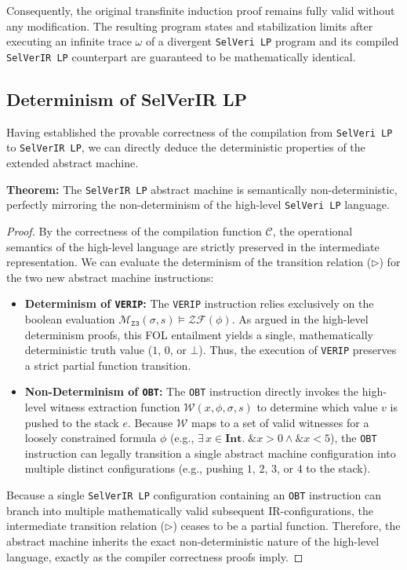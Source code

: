 \documentclass{article}
\begin{document}
Consequently, the original transfinite induction proof remains fully valid without any modification. The resulting program states and stabilization limits after executing an infinite trace $\omega$ of a divergent \texttt{SelVeri LP} program and its compiled \texttt{SelVerIR LP} counterpart are guaranteed to be mathematically identical.

\subsection{Determinism of SelVerIR LP}

Having established the provable correctness of the compilation from \texttt{SelVeri LP} to \texttt{SelVerIR LP}, we can directly deduce the deterministic properties of the extended abstract machine.

\textbf{Theorem:} The \texttt{SelVerIR LP} abstract machine is semantically non-deterministic, perfectly mirroring the non-determinism of the high-level \texttt{SelVeri LP} language.

\begin{proof}
By the correctness of the compilation function $\mathcal{C}$, the operational semantics of the high-level language are strictly preserved in the intermediate representation. We can evaluate the determinism of the transition relation ($\triangleright$) for the two new abstract machine instructions:

\begin{itemize}
    \item \textbf{Determinism of \texttt{VERIP}:} The \texttt{VERIP} instruction relies exclusively on the boolean evaluation $\mathcal{M}_{\mathtt{Z3}}(\sigma, s) \models \mathcal{ZF}(\phi)$. As argued in the high-level determinism proofs, this FOL entailment yields a single, mathematically deterministic truth value ($1$, $0$, or $\bot$). Thus, the execution of \texttt{VERIP} preserves a strict partial function transition.
    
    \item \textbf{Non-Determinism of \texttt{OBT}:} The \texttt{OBT} instruction directly invokes the high-level witness extraction function $\mathcal{W}(x, \phi, \sigma, s)$ to determine which value $v$ is pushed to the stack $e$. Because $\mathcal{W}$ maps to a set of valid witnesses for a loosely constrained formula $\phi$ (e.g., $\exists\, x \in \textbf{Int}.\; \texttt{\&}x > 0 \land \texttt{\&}x < 5$), the \texttt{OBT} instruction can legally transition a single abstract machine configuration into multiple distinct configurations (e.g., pushing $1$, $2$, $3$, or $4$ to the stack).
\end{itemize}

Because a single \texttt{SelVerIR LP} configuration containing an \texttt{OBT} instruction can branch into multiple mathematically valid subsequent IR-configurations, the intermediate transition relation ($\triangleright$) ceases to be a partial function. Therefore, the abstract machine inherits the exact non-deterministic nature of the high-level language, exactly as the compiler correctness proofs imply.
\end{proof}
\end{document}

